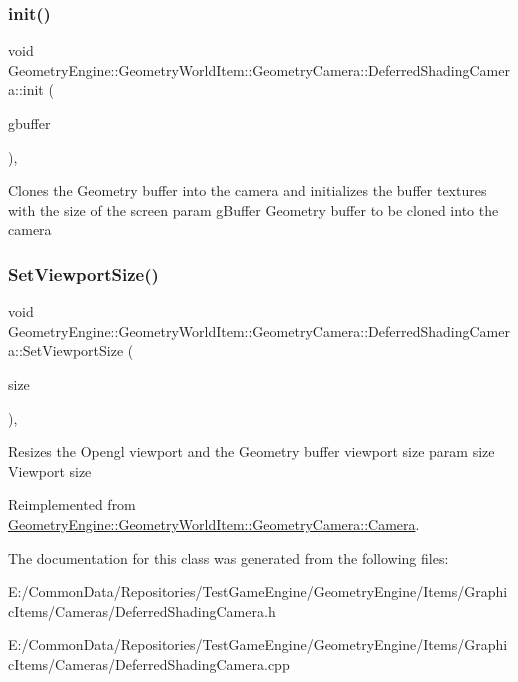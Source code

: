 \subsubsection{\texorpdfstring{init()}{init()}}
{\footnotesize\ttfamily void Geometry\+Engine\+::\+Geometry\+World\+Item\+::\+Geometry\+Camera\+::\+Deferred\+Shading\+Camera\+::init (\begin{DoxyParamCaption}\item[{const \mbox{\hyperlink{class_geometry_engine_1_1_geometry_buffer_1_1_g_buffer}{Geometry\+Buffer\+::\+G\+Buffer}} \&}]{gbuffer }\end{DoxyParamCaption})\hspace{0.3cm}{\ttfamily [protected]}, {\ttfamily [virtual]}}

Clones the Geometry buffer into the camera and initializes the buffer textures with the size of the screen param g\+Buffer Geometry buffer to be cloned into the camera \mbox{\label{class_geometry_engine_1_1_geometry_world_item_1_1_geometry_camera_1_1_deferred_shading_camera_a16da38cfd723b755a63c372c08bbedf7}} 
\subsubsection{\texorpdfstring{SetViewportSize()}{SetViewportSize()}}
{\footnotesize\ttfamily void Geometry\+Engine\+::\+Geometry\+World\+Item\+::\+Geometry\+Camera\+::\+Deferred\+Shading\+Camera\+::\+Set\+Viewport\+Size (\begin{DoxyParamCaption}\item[{const Q\+Vector4D \&}]{size }\end{DoxyParamCaption})\hspace{0.3cm}{\ttfamily [override]}, {\ttfamily [virtual]}}

Resizes the Opengl viewport and the Geometry buffer viewport size param size Viewport size 

Reimplemented from \mbox{\hyperlink{class_geometry_engine_1_1_geometry_world_item_1_1_geometry_camera_1_1_camera_aabac97d1334ff271308102e53735d042}{Geometry\+Engine\+::\+Geometry\+World\+Item\+::\+Geometry\+Camera\+::\+Camera}}.



The documentation for this class was generated from the following files\+:\begin{DoxyCompactItemize}
\item 
E\+:/\+Common\+Data/\+Repositories/\+Test\+Game\+Engine/\+Geometry\+Engine/\+Items/\+Graphic\+Items/\+Cameras/Deferred\+Shading\+Camera.\+h\item 
E\+:/\+Common\+Data/\+Repositories/\+Test\+Game\+Engine/\+Geometry\+Engine/\+Items/\+Graphic\+Items/\+Cameras/Deferred\+Shading\+Camera.\+cpp\end{DoxyCompactItemize}
